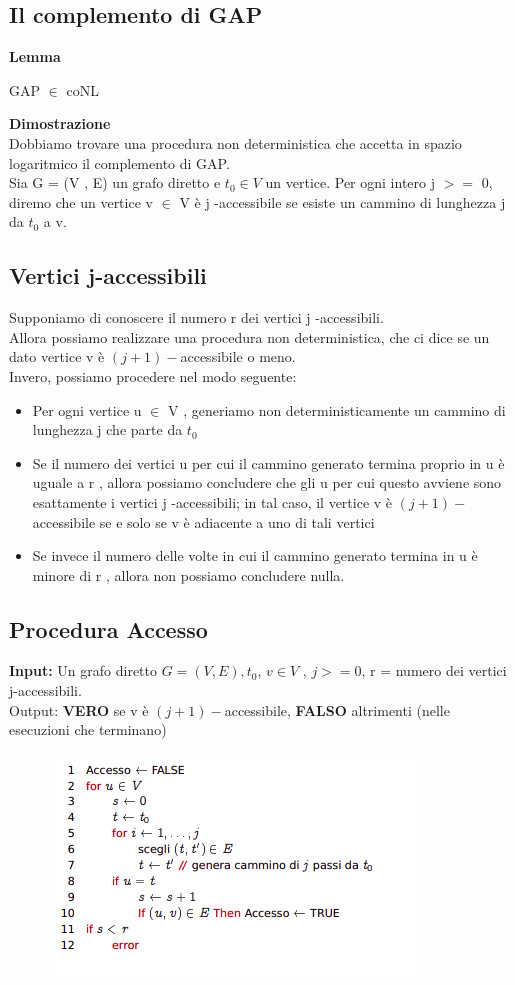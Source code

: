 \subsection{Il complemento di GAP}
\textbf{Lemma}
\begin{center}
    GAP $\in$ coNL
\end{center}
\textbf{Dimostrazione}\\
Dobbiamo trovare una procedura non deterministica che accetta in spazio logaritmico il complemento di GAP.\\
Sia G = (V , E) un grafo diretto e $t_0 \in V$ un vertice. Per ogni intero j $>=$ 0,
diremo che un vertice v $\in$ V è j -accessibile se esiste un cammino di lunghezza j da $t_0$ a v.
\subsection{Vertici j-accessibili}
Supponiamo di conoscere il numero r dei vertici j -accessibili.
\\Allora possiamo realizzare una procedura non deterministica, che ci dice se un dato vertice v è $(j+1)-$accessibile o meno.
\\Invero, possiamo procedere nel modo seguente:
\begin{itemize}
    \item Per ogni vertice u $\in$ V , generiamo non deterministicamente un cammino di lunghezza j che parte da $t_0$ 
    \item Se il numero dei vertici u per cui il cammino generato termina proprio in u è uguale a r , allora possiamo concludere che gli u per cui questo avviene sono esattamente i vertici j -accessibili; in tal caso, il vertice v è $(j+1)-$accessibile se e solo se v è adiacente a uno di tali vertici
    \item Se invece il numero delle volte in cui il cammino generato termina in u è minore di r , allora non possiamo concludere nulla.
\end{itemize}
\newpage
\subsection{Procedura Accesso}
\textbf{Input:} Un grafo diretto $G = (V , E), t_0$, $v \in V$ , $j >= 0$, r = numero dei vertici j-accessibili.
\\Output: \textbf{VERO} se v è $(j+1)-$accessibile, \textbf{FALSO} altrimenti (nelle esecuzioni che terminano)
\begin{figure}[htp]
    \includegraphics[scale=0.7]{tesi_stile/img/foto5cap18.png}
\end{figure}
